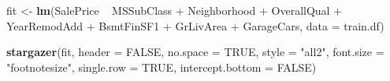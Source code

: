\documentclass[]{article}
\newenvironment{Shaded}{\begin{snugshade}}{\end{snugshade}}
\newcommand{\KeywordTok}[1]{\textcolor[rgb]{0.13,0.29,0.53}{\textbf{{#1}}}}
\newcommand{\DataTypeTok}[1]{\textcolor[rgb]{0.13,0.29,0.53}{{#1}}}
\newcommand{\StringTok}[1]{\textcolor[rgb]{0.31,0.60,0.02}{{#1}}}
\newcommand{\OtherTok}[1]{\textcolor[rgb]{0.56,0.35,0.01}{{#1}}}
\newcommand{\NormalTok}[1]{{#1}}
\begin{document}
\begin{Shaded}
\begin{Highlighting}[]
\NormalTok{fit <-}\StringTok{ }\KeywordTok{lm}\NormalTok{(SalePrice ~}\StringTok{ }\NormalTok{MSSubClass +}\StringTok{ }\NormalTok{Neighborhood +}\StringTok{ }
\StringTok{            }\NormalTok{OverallQual +}\StringTok{ }\NormalTok{YearRemodAdd +}\StringTok{ }\NormalTok{BsmtFinSF1 +}\StringTok{ }
\StringTok{            }\NormalTok{GrLivArea +}\StringTok{ }\NormalTok{GarageCars, }\DataTypeTok{data =} \NormalTok{train.df)}

\KeywordTok{stargazer}\NormalTok{(fit, }\DataTypeTok{header =} \OtherTok{FALSE}\NormalTok{, }\DataTypeTok{no.space =} \OtherTok{TRUE}\NormalTok{, }
          \DataTypeTok{style =} \StringTok{"all2"}\NormalTok{, }\DataTypeTok{font.size =} \StringTok{"footnotesize"}\NormalTok{, }
          \DataTypeTok{single.row =} \OtherTok{TRUE}\NormalTok{, }\DataTypeTok{intercept.bottom =} \OtherTok{FALSE}\NormalTok{)}
\end{Highlighting}
\end{Shaded}
\end{document}
